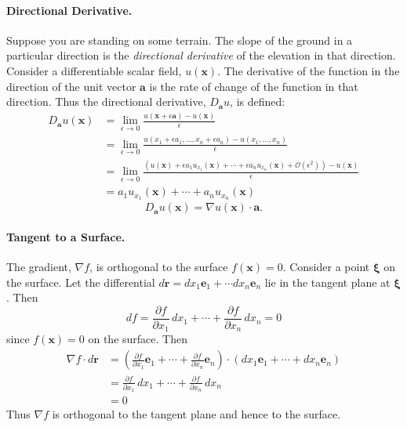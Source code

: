 \paragraph{Directional Derivative.}
Suppose you are standing on some terrain.  The slope of the ground in 
a particular direction is the \textit{directional derivative} of the
elevation in that direction.  Consider a differentiable scalar field,
$u(\mathbf{x})$.  The derivative of the function in the direction of the
unit vector $\mathbf{a}$ is the rate of change of the function in that 
direction.  Thus the directional derivative, $D_{\mathbf{a}} u$, is defined:
\begin{align*}
  D_{\mathbf{a}} u(\mathbf{x}) 
  &= \lim_{\epsilon \to 0} 
  \frac{u(\mathbf{x} + \epsilon \mathbf{a}) - u(\mathbf{x})}{\epsilon} \\
  &= \lim_{\epsilon \to 0} 
  \frac{u(x_1 + \epsilon a_1, \ldots, x_n + \epsilon a_n)
    - u(x_1, \ldots, x_n) }{\epsilon} \\
  &= \lim_{\epsilon \to 0} 
  \frac{ \left( u(\mathbf{x}) 
      + \epsilon a_1 u_{x_1}(\mathbf{x}) + \cdots
      + \epsilon a_n u_{x_n}(\mathbf{x}) 
      + \mathcal{O}(\epsilon^2) \right) - u(\mathbf{x}) }
  { \epsilon } \\
  &= a_1 u_{x_1}(\mathbf{x}) + \cdots + a_n u_{x_n}(\mathbf{x}) 
\end{align*}
\[
D_{\mathbf{a}} u(\mathbf{x}) = \nabla u(\mathbf{x}) \cdot \mathbf{a}.
\]








\paragraph{Tangent to a Surface.}
The gradient, $\nabla f$, is orthogonal to the surface $f(\mathbf{x}) = 0$.
Consider a point $\boldsymbol{\xi}$ on the surface.  Let the differential 
$d \mathbf{r} = d x_1 \mathbf{e}_1 + \cdots d x_n \mathbf{e}_n$ lie in the tangent
plane at $\boldsymbol{\xi}$.  Then
\[
d f = \frac{\partial f}{\partial x_1}\,d x_1 + \cdots + \frac{\partial f}{\partial x_n} \,d x_n = 0
\]
since $f(\mathbf{x}) = 0$ on the surface.  Then
\begin{align*}
  \nabla f \cdot d \mathbf{r} 
  &= \left( \frac{\partial f}{\partial x_1} \mathbf{e}_1 + \cdots 
    + \frac{\partial f}{\partial x_n} \mathbf{e}_n \right) \cdot
  \left( d x_1 \mathbf{e}_1 + \cdots + d x_n \mathbf{e}_n \right) \\
  &= \frac{\partial f}{\partial x_1} \,d x_1 + \cdots + \frac{\partial f}{\partial x_n} \,d x_n \\
  &= 0
\end{align*}
Thus $\nabla f$ is orthogonal to the tangent plane and hence to the surface.





